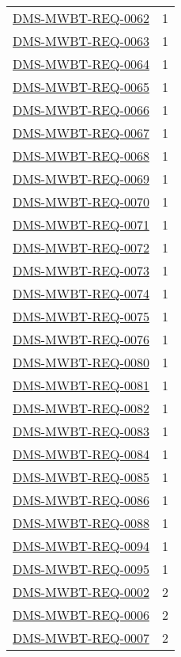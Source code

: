 \begin{small}
\begin{longtable}[]{|l|l|}
\hyperref[DMS-MWBT-REQ-0062]{DMS-MWBT-REQ-0062} & 1 \\
\hyperref[DMS-MWBT-REQ-0063]{DMS-MWBT-REQ-0063} & 1 \\
\hyperref[DMS-MWBT-REQ-0064]{DMS-MWBT-REQ-0064} & 1 \\
\hyperref[DMS-MWBT-REQ-0065]{DMS-MWBT-REQ-0065} & 1 \\
\hyperref[DMS-MWBT-REQ-0066]{DMS-MWBT-REQ-0066} & 1 \\
\hyperref[DMS-MWBT-REQ-0067]{DMS-MWBT-REQ-0067} & 1 \\
\hyperref[DMS-MWBT-REQ-0068]{DMS-MWBT-REQ-0068} & 1 \\
\hyperref[DMS-MWBT-REQ-0069]{DMS-MWBT-REQ-0069} & 1 \\
\hyperref[DMS-MWBT-REQ-0070]{DMS-MWBT-REQ-0070} & 1 \\
\hyperref[DMS-MWBT-REQ-0071]{DMS-MWBT-REQ-0071} & 1 \\
\hyperref[DMS-MWBT-REQ-0072]{DMS-MWBT-REQ-0072} & 1 \\
\hyperref[DMS-MWBT-REQ-0073]{DMS-MWBT-REQ-0073} & 1 \\
\hyperref[DMS-MWBT-REQ-0074]{DMS-MWBT-REQ-0074} & 1 \\
\hyperref[DMS-MWBT-REQ-0075]{DMS-MWBT-REQ-0075} & 1 \\
\hyperref[DMS-MWBT-REQ-0076]{DMS-MWBT-REQ-0076} & 1 \\
\hyperref[DMS-MWBT-REQ-0080]{DMS-MWBT-REQ-0080} & 1 \\
\hyperref[DMS-MWBT-REQ-0081]{DMS-MWBT-REQ-0081} & 1 \\
\hyperref[DMS-MWBT-REQ-0082]{DMS-MWBT-REQ-0082} & 1 \\
\hyperref[DMS-MWBT-REQ-0083]{DMS-MWBT-REQ-0083} & 1 \\
\hyperref[DMS-MWBT-REQ-0084]{DMS-MWBT-REQ-0084} & 1 \\
\hyperref[DMS-MWBT-REQ-0085]{DMS-MWBT-REQ-0085} & 1 \\
\hyperref[DMS-MWBT-REQ-0086]{DMS-MWBT-REQ-0086} & 1 \\
\hyperref[DMS-MWBT-REQ-0088]{DMS-MWBT-REQ-0088} & 1 \\
\hyperref[DMS-MWBT-REQ-0094]{DMS-MWBT-REQ-0094} & 1 \\
\hyperref[DMS-MWBT-REQ-0095]{DMS-MWBT-REQ-0095} & 1 \\
\hyperref[DMS-MWBT-REQ-0002]{DMS-MWBT-REQ-0002} & 2 \\
\hyperref[DMS-MWBT-REQ-0006]{DMS-MWBT-REQ-0006} & 2 \\
\hyperref[DMS-MWBT-REQ-0007]{DMS-MWBT-REQ-0007} & 2 \\

\end{longtable}
\end{small}
